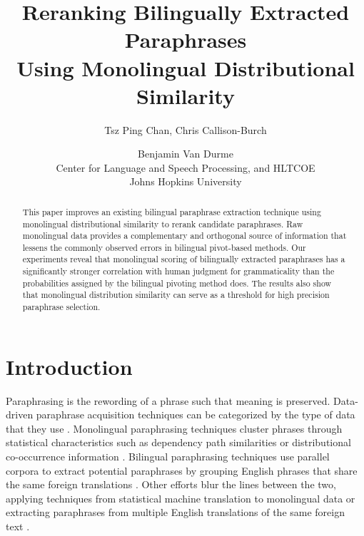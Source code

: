 \documentclass[11pt]{article}
\title{Reranking Bilingually Extracted Paraphrases \\ Using Monolingual Distributional Similarity}
\author{Tsz Ping Chan, Chris Callison-Burch \and Benjamin Van Durme\\
  Center for Language and Speech Processing, and HLTCOE\\
  Johns Hopkins University\\
  }
\date{}
\newcommand{\mnote}[1]{\marginpar{\raggedleft\footnotesize\itshape#1}}
\begin{document}
\maketitle
\begin{abstract}
This paper improves an existing bilingual paraphrase extraction technique using monolingual distributional similarity to rerank candidate paraphrases.  Raw monolingual data provides a complementary and orthogonal source of information that lessens the commonly observed errors in bilingual pivot-based methods. %
Our experiments reveal that monolingual scoring of bilingually extracted paraphrases has a significantly stronger correlation with human judgment for grammaticality than the probabilities assigned by the bilingual pivoting method does. The results also show that monolingual distribution similarity can serve as a threshold for high precision paraphrase selection.


\end{abstract} 


\section{Introduction}
Paraphrasing is the rewording of a phrase such that meaning is preserved. Data-driven paraphrase acquisition techniques can be categorized by the type of data that they use \cite{MadnaniDorr10}.  Monolingual paraphrasing techniques cluster phrases through statistical characteristics such as dependency path similarities or distributional co-occurrence information \cite{Lin01discoveryof,PascaDienes05}.   Bilingual paraphrasing techniques use parallel corpora to extract potential paraphrases by grouping English phrases that share the same foreign translations \cite{BannardCallisonBurch05}.  Other efforts blur the lines between the two, applying techniques from statistical machine translation to monolingual data or extracting paraphrases from multiple English translations of the same foreign text \cite{Barzilay2001,PangEtAl03,QuirkDolanBrockett04}.
\end{document}
